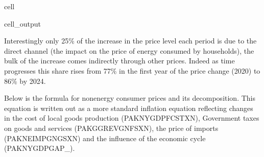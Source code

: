 \documentclass[letterpaper,10pt,english]{jupyterBook}
\begin{document}
\begin{sphinxuseclass}{cell}
\begin{sphinxVerbatimOutput}
\begin{sphinxuseclass}{cell_output}
\end{sphinxuseclass}\end{sphinxVerbatimOutput}

\end{sphinxuseclass}
\sphinxAtStartPar
Interestingly only 25\% of the increase in the price level each period is due to the direct channel (the impact on the price of energy consumed by households), the bulk of the increase comes indirectly through other prices.  Indeed as time progresses this share rises from 77\% in the first year of the price change (2020) to 86\% by 2024.

\sphinxAtStartPar
Below is the formula for nonenergy consumer prices and its decomposition. This equation is written out as a more standard inflation equation reflecting changes in the cost of local goods production (PAKNYGDPFCSTXN), Government taxes on goods and services (PAKGGREVGNFSXN), the price of imports (PAKNEIMPGNGSXN) and the influence of the economic cycle (PAKNYGDPGAP\_).
\end{document}
